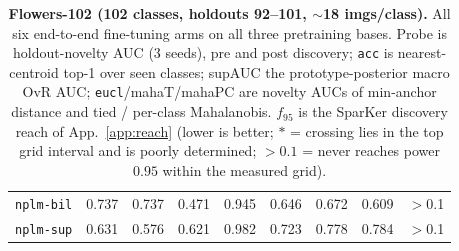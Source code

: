 \documentclass{article}
\begin{document}
\begin{table}[p]
\begin{tabular}{lcccccccc}
\texttt{nplm-bil} & 0.737 & 0.737 & 0.471 & 0.945 & 0.646 & 0.672 & 0.609 & $>$0.1 \\
\texttt{nplm-sup} & 0.631 & 0.576 & 0.621 & 0.982 & 0.723 & 0.778 & 0.784 & $>$0.1 \\
\bottomrule
\end{tabular}
\caption{\textbf{Flowers-102 (102 classes, holdouts 92--101, $\sim$18 imgs/class).} All six end-to-end fine-tuning arms on all three
pretraining bases. Probe is holdout-novelty AUC (3 seeds), pre and post
discovery; \texttt{acc} is nearest-centroid top-1 over seen classes; supAUC the
prototype-posterior macro OvR AUC; \texttt{eucl}/mahaT/mahaPC are novelty AUCs
of min-anchor distance and tied / per-class Mahalanobis. $f_{95}$ is the
SparKer discovery reach of App.~\ref{app:reach} (lower is better;
$*$ = crossing lies in the top grid interval and is poorly determined;
$>0.1$ = never reaches power $0.95$ within the measured grid).}
\label{tab:full-flowers}
\end{table}
\end{document}
